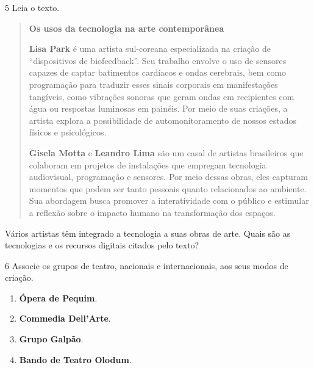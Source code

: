 \num{5} Leia o texto.

\begin{quote}
\textbf{Os usos da tecnologia na arte contemporânea}

\textbf{Lisa Park} é uma artista sul-coreana especializada na criação de
``dispositivos de biofeedback''. Seu trabalho envolve o uso de 
sensores capazes de captar batimentos cardíacos e ondas cerebrais, 
bem como programação para traduzir esses sinais corporais em 
manifestações tangíveis, como vibrações sonoras que geram ondas 
em recipientes com água ou respostas luminosas em painéis. Por meio 
de suas criações, a artista explora a possibilidade de automonitoramento 
de nossos estados físicos e psicológicos.

\textbf{Gisela Motta} e \textbf{Leandro Lima} são um casal de artistas brasileiros que 
colaboram em projetos de instalações que empregam tecnologia audiovisual, 
programação e sensores. Por meio dessas obras, eles capturam momentos 
que podem ser tanto pessoais quanto relacionados ao ambiente. Sua abordagem 
busca promover a interatividade com o público e estimular a reflexão sobre 
o impacto humano na transformação dos espaços.

\end{quote}

Vários artistas têm integrado a tecnologia a suas obras de arte. Quais
são as tecnologias e os recursos digitais citados pelo texto?


\num{6} Associe os grupos de teatro, nacionais e internacionais, aos seus modos de criação.

\begin{enumerate}
\item \textbf{Ópera de Pequim}.

\item \textbf{Commedia Dell'Arte}.

\item \textbf{Grupo Galpão}.

\item \textbf{Bando de Teatro Olodum}.
\end{enumerate}

